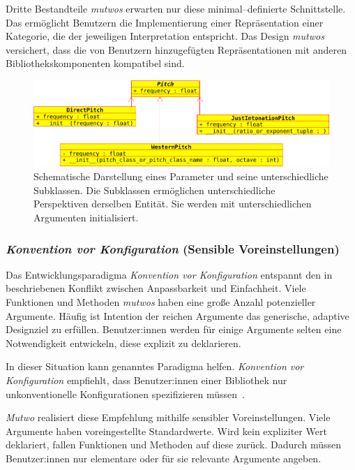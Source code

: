 \documentclass[12pt,a4paper,ngerman]{article}
\begin{document}
Dritte Bestandteile \emph{mutwos} erwarten nur diese minimal--definierte Schnittstelle.
Das ermöglicht Benutzern die Implementierung einer Repräsentation einer Kategorie, die der jeweiligen Interpretation entspricht.
Das Design \emph{mutwos} versichert, dass die von Benutzern hinzugefügten Repräsentationen mit anderen Bibliothekskomponenten kompatibel sind.

\begin{figure}[h!]
    \includegraphics[scale=0.4]{uml_diagrams/pitches.png}

    \caption{%
        Schematische Darstellung eines Parameter und seine unterschiedliche Subklassen.
        Die Subklassen ermöglichen unterschiedliche Perspektiven derselben Entität.
        Sie werden mit unterschiedlichen Argumenten initialisiert.
    }

\end{figure}

\subsubsection{\emph{Konvention vor Konfiguration} (Sensible Voreinstellungen)}

Das Entwicklungsparadigma \emph{Konvention vor Konfiguration} entspannt den in \emph{} beschriebenen Konflikt zwischen Anpassbarkeit und Einfachheit.
Viele Funktionen und Methoden \emph{mutwos} haben eine große Anzahl potenzieller Argumente.
Häufig ist Intention der reichen Argumente das generische, adaptive Designziel zu erfüllen.
Benutzer:innen werden für einige Argumente selten eine Notwendigkeit entwickeln, diese explizit zu deklarieren.

\bigskip

In dieser Situation kann genanntes Paradigma helfen.
\emph{Konvention vor Konfiguration} empfiehlt, dass Benutzer:innen einer Bibliothek nur unkonventionelle Konfigurationen spezifizieren müssen~\parencite{conventionOverConfiguration}.

\bigskip

\emph{Mutwo} realisiert diese Empfehlung mithilfe sensibler Voreinstellungen.
Viele Argumente haben voreingestellte Standardwerte.
Wird kein expliziter Wert deklariert, fallen Funktionen und Methoden auf diese zurück.
Dadurch müssen Benutzer:innen nur elementare oder für sie relevante Argumente angeben.
\end{document}
